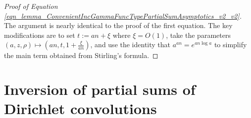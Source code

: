 \documentclass[11pt,reqno,a4letter]{article}
\numberwithin{equation}{section}
\numberwithin{figure}{section}
\numberwithin{table}{section}
\theoremstyle{plain}
\numberwithin{theorem}{section}
\theoremstyle{definition}
\theoremstyle{remark}
\begin{document}
\begin{proof}[Proof of Equation \eqref{eqn_lemma_ConvenientIncGammaFuncTypePartialSumAsymptotics_v2_v2}]
The argument is nearly identical to the proof of the first equation. 
The key modifications are to set $t := an + \xi$ where $\xi = O(1)$, take the parameters 
$\left(a, z, \rho\right) \mapsto \left(an, t, 1 + \frac{\xi}{an}\right)$, and 
use the identity that $a^{an} = e^{an \log a}$ to simplify the main term obtained 
from Stirling's formula. 
\end{proof}

\section{Inversion of partial sums of Dirichlet convolutions}
\label{Section_PrelimProofs_Config} 
\label{subSection_PrelimProofs_Config_InversionTheorem}
\end{document}
